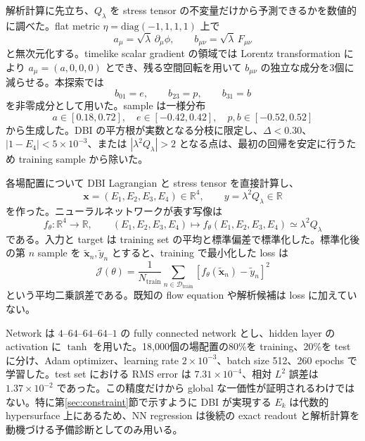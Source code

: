 \documentclass[a4paper,11pt]{ltjsarticle}
\numberwithin{equation}{section}
\begin{document}
解析計算に先立ち、$Q_\lambda$ を stress tensor の不変量だけから予測できるかを数値的に調べた。flat metric $\eta=\mathrm{diag}(-1,1,1,1)$ 上で
\begin{equation}
 a_\mu=\sqrt\lambda\,\partial_\mu\phi,
 \qquad
 b_{\mu\nu}=\sqrt\lambda\,F_{\mu\nu}
 \label{eq:dimensionless-fields-nn}
\end{equation}
と無次元化する。timelike scalar gradient の領域では Lorentz transformation により $a_\mu=(a,0,0,0)$ とでき、残る空間回転を用いて $b_{\mu\nu}$ の独立な成分を3個に減らせる。本探索では
\begin{equation}
 b_{01}=e,\qquad b_{23}=p,\qquad b_{31}=b
\end{equation}
を非零成分として用いた。sample は一様分布
\begin{equation}
 a\in[0.18,0.72],\quad
 e\in[-0.42,0.42],\quad
 p,b\in[-0.52,0.52]
 \label{eq:nn-sampling-range}
\end{equation}
から生成した。DBI の平方根が実数となる分枝に限定し、$\Delta<0.30$、$|1-E_4|<5\times10^{-3}$、または $|\lambda^2Q_\lambda|>2$ となる点は、最初の回帰を安定に行うため training sample から除いた。

各場配置について DBI Lagrangian と stress tensor を直接計算し、
\begin{equation}
 \bm{x}=(E_1,E_2,E_3,E_4)\in\mathbb R^4,
 \qquad
 y=\lambda^2Q_\lambda\in\mathbb R
 \label{eq:nn-data}
\end{equation}
を作った。ニューラルネットワークが表す写像は
\begin{equation}
 f_\theta:\mathbb R^4\longrightarrow\mathbb R,
 \qquad
 (E_1,E_2,E_3,E_4)\longmapsto f_\theta(E_1,E_2,E_3,E_4)\simeq\lambda^2Q_\lambda
 \label{eq:nn-map}
\end{equation}
である。入力と target は training set の平均と標準偏差で標準化した。標準化後の第 $n$ sample を $\widetilde{\bm{x}}_n,\widetilde y_n$ とすると、training で最小化した loss は
\begin{equation}
 \mathcal J(\theta)
 =\frac1{N_{\mathrm{train}}}
 \sum_{n\in\mathcal D_{\mathrm{train}}}
 \left[f_\theta(\widetilde{\bm{x}}_n)-\widetilde y_n\right]^2
 \label{eq:nn-loss}
\end{equation}
という平均二乗誤差である。既知の flow equation や解析候補は loss に加えていない。

Network は $4$--$64$--$64$--$64$--$1$ の fully connected network とし、hidden layer の activation に $\tanh$ を用いた。18,000個の場配置の80\%を training、20\%を test に分け、Adam optimizer、learning rate $2\times10^{-3}$、batch size 512、260 epochs で学習した。test set における RMS error は $7.31\times10^{-4}$、相対 $L^2$ 誤差は $1.37\times10^{-2}$ であった。この精度だけから global な一価性が証明されるわけではない。特に第\ref{sec:constraint}節で示すように DBI が実現する $E_k$ は代数的 hypersurface 上にあるため、NN regression は後続の exact readout と解析計算を動機づける予備診断としてのみ用いる。
\end{document}
